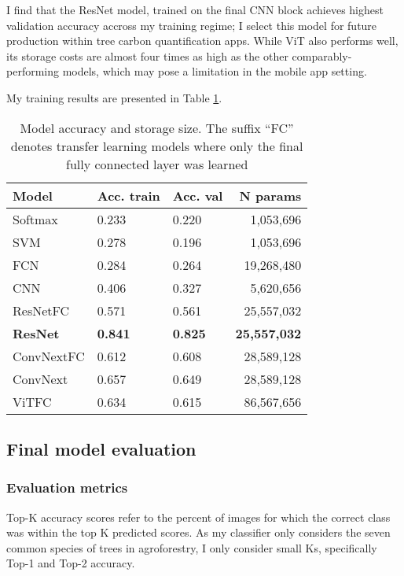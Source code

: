 \documentclass[10pt,twocolumn,letterpaper]{article}
\begin{document}
I find that the ResNet model, trained on the final CNN block achieves highest validation accuracy accross my training regime; I select this model for future production within tree carbon quantification apps. While ViT also performs well, its storage costs are almost four times as high as the other comparably-performing models, which may pose a limitation in the mobile app setting. 

My training results are presented in Table \ref{tab:model_acc}.

\begin{table}[!htbp]
  \begin{center}
    \small
  \begin{tabular}{|l|l|l|r|}
  \hline
  Model & Acc. train & Acc. val & N params\\
  \hline\hline
  Softmax & 0.233 & 0.220 & 1,053,696 \\
  SVM & 0.278 & 0.196 & 1,053,696\\
  FCN & 0.284 & 0.264 & 19,268,480\\
  CNN & 0.406 & 0.327 & 5,620,656\\
  ResNetFC & 0.571 & 0.561 & 25,557,032\\
  \textbf{ResNet} & \textbf{0.841} & \textbf{0.825} & \textbf{25,557,032}\\
  ConvNextFC & 0.612 & 0.608 & 28,589,128\\
  ConvNext & 0.657 & 0.649 & 28,589,128\\
  ViTFC & 0.634 & 0.615 & 86,567,656\\
  \hline
  \end{tabular}
  \end{center}
  \caption{\label{tab:model_acc} Model accuracy and storage size. The suffix ``FC'' denotes transfer learning models where only the final fully connected layer was learned}
  \end{table}

\subsection{Final model evaluation}
\subsubsection{Evaluation metrics}
Top-K accuracy scores refer to the percent of images for which the correct class was within the top K predicted scores. As my classifier only considers the seven common species of trees in agroforestry, I only consider small Ks, specifically Top-1 and Top-2 accuracy.
\end{document}
